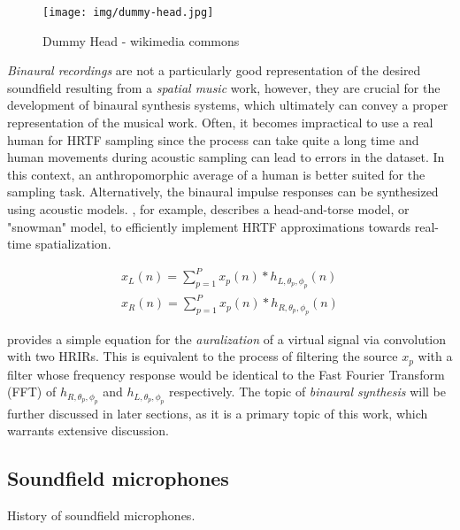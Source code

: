 \begin{figure}[ht!]%
\centering
\texttt{[image: img/dummy-head.jpg]} 
\label{fig:dummy-head}
\caption{Dummy Head - wikimedia commons}
\end{figure}

\textit{Binaural recordings} are not a particularly good representation of the desired soundfield resulting from a \textit{spatial music} work, however, they are crucial for the development of binaural synthesis systems, which ultimately can convey a proper representation of the musical work. Often, it becomes impractical to use a real human for HRTF sampling since the process can take quite a long time and human movements during acoustic sampling can lead to errors in the dataset. In this context, an anthropomorphic average of a human is better suited for the sampling task. Alternatively, the binaural impulse responses can be synthesized using acoustic models. \cite{algazi2002use}, for example, describes a head-and-torse model, or "snowman" model, to efficiently implement HRTF approximations towards real-time spatialization. 

\begin{equation} \label{eq:conv-hrir}
\begin{array}{l}
x_{L}(n)=\sum_{p=1}^{P} x_{p}(n) * h_{L, \theta_{p}, \phi_{p}}(n) \\
x_{R}(n)=\sum_{p=1}^{P} x_{p}(n) * h_{R, \theta_{p}, \phi_{p}}(n)
\end{array}
\end{equation}

\cite{hacihabiboglu2017perceptual} provides a simple equation for the \textit{auralization} of a virtual signal via convolution with two HRIRs. This is equivalent to the process of filtering the source $x_p$ with a filter whose frequency response would be identical to the Fast Fourier Transform (FFT) of $h_{R, \theta_{p}, \phi_{p}}$ and $h_{L, \theta_{p}, \phi_{p}}$ respectively. The topic of \textit{binaural synthesis} will be further discussed in later sections, as it is a primary topic of this work, which warrants extensive discussion.

\subsection{Soundfield microphones}

History of soundfield microphones.


